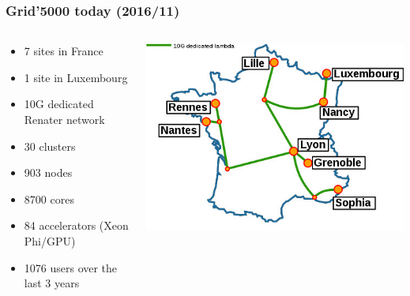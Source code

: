\documentclass[11pt,compress,final]{beamer}
\begin{document}
\begin{frame}
\frametitle{Grid'5000 today (2016/11)}
\begin{columns}[c]
  \begin{column}{6cm}
	\begin{itemize}
	\item 7 sites in France
	\item 1 site in Luxembourg
	\item 10G dedicated Renater network
	\item 30 clusters
	\item 903 nodes
	\item 8700 cores
	\item 84 accelerators (Xeon Phi/GPU)
	\item 1076 users over the last 3 years
	\end{itemize}
  \end{column}
  \begin{column}{6cm}
	\includegraphics[scale=0.42]{figures/Renater5-g5k}
  \end{column}
\end{columns}
\end{frame}
\end{document}
